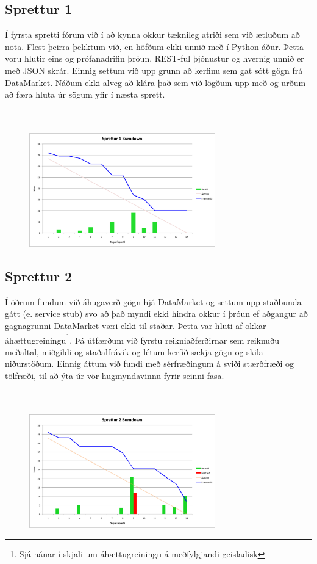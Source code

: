 \documentclass{article}
\begin{document}
\subsection{Sprettur 1}
Í fyrsta spretti fórum við í að kynna okkur tæknileg atriði sem við ætluðum að
nota.
Flest þeirra þekktum við, en höfðum ekki unnið með í Python áður. Þetta voru hlutir
eins og prófanadrifin þróun, REST-ful þjónustur og hvernig 
unnið er með JSON skrár. Einnig settum við upp grunn að kerfinu sem gat sótt
gögn frá DataMarket. Náðum ekki alveg að klára það sem við lögðum 
upp með og urðum að færa hluta úr sögum yfir í næsta sprett.
\hfil \\
\hfil \\
\hfil \\
\begin{figure}[H]
  \centering
  \includegraphics[width=0.72\textwidth]{Sprettur1_Burndown.png}
  \caption{}
  \label{fig:sp1}
\end{figure}
\newpage
\subsection{Sprettur 2}
Í öðrum fundum við áhugaverð gögn hjá DataMarket og settum upp staðbunda
gátt (e. service stub) svo að það myndi ekki hindra okkur í þróun ef 
aðgangur að gagnagrunni DataMarket væri ekki til staðar. Þetta var hluti af
okkar áhættugreiningu\footnote[1]{Sjá nánar í skjali um áhættugreiningu á meðfylgjandi geisladisk}. 
Þá útfærðum við fyrstu reikniaðferðirnar sem reiknuðu meðaltal, miðgildi og staðalfrávik
og létum kerfið sækja gögn og skila niðurstöðum.
Einnig áttum við fundi með sérfræðingum á sviði stærðfræði og tölfræði, til að ýta
úr vör hugmyndavinnu fyrir seinni fasa.
\hfil \\
\hfil \\
\hfil \\
\begin{figure}[H]
 \centering
 \includegraphics[width=0.72\textwidth]{Sprettur2_Burndown.png}
 \caption{}
\end{figure}
\label{fig:sp2}
\newpage
\end{document}
